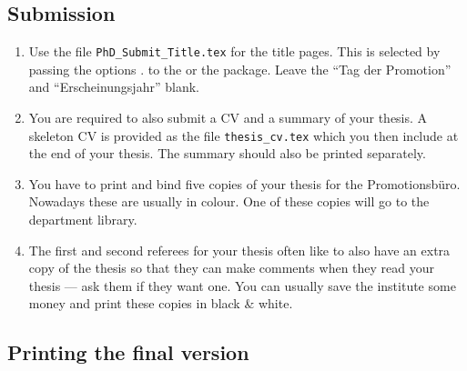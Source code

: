 \subsection{Submission}

\begin{enumerate}
\item Use the file \texttt{PhD\_Submit\_Title.tex} for the title
  pages. 
  This is selected by passing the options .
  to the  or the  package.
  Leave the \foreignquote{ngerman}{Tag der Promotion} and
  \foreignquote{ngerman}{Erscheinungsjahr} blank.
\item You are required to also submit a CV and a summary of your
  thesis. A skeleton CV is provided as the file
  \texttt{thesis\_cv.tex} which you then include at the end of your
  thesis. The summary should also be printed separately.
\item You have to print and bind five copies of your thesis for the
  \foreignlanguage{ngerman}{Promotionsbüro}. Nowadays these are
  usually in colour.
  One of these copies will go to the department library.
\item The first and second referees for your thesis often like to also
  have an extra copy of the thesis so that they can make comments when they read
  your thesis --- ask them if they want one. You can usually save the
  institute some money and print these copies in black \& white.
\end{enumerate}


\subsection{Printing the final version}

